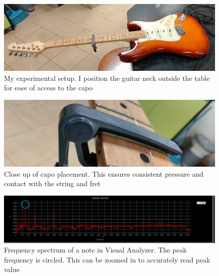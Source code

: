 \begin{figure}[!htbp]
    \includegraphics[width = \textwidth]{ee/experiment_setup.jpg}
    \caption{My experimental setup. I position the guitar neck outside the table for ease of access to the capo} \label{fig5}
\end{figure}
\begin{figure}[!htbp]
    \includegraphics[width = \textwidth]{ee/capo_on_fret.jpg}
    \caption{Close up of capo placement. This ensures consistent pressure and contact with the string and fret} \label{fig6}
\end{figure}
\begin{figure}[!htbp]
    \includegraphics[width = \textwidth]{./ee/freq.png}
    \caption{Frequency spectrum of a note in Visual Analyzer. The peak frequency is circled. This can be zoomed in to accurately read peak value} \label{fig7}
\end{figure}